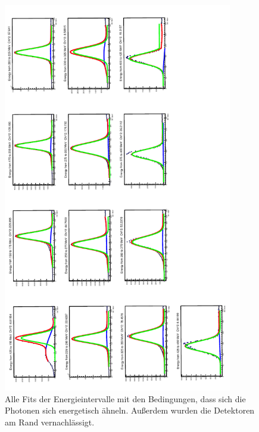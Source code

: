 \documentclass[a4paper,11pt,oneside,final,german,openbib,pdftex]{scrbook}
\begin{document}
{\begin{appendix}
\begin{figure}[h!]
	\begin{center}
		\includegraphics[width=100mm]{20170405Strahlzeit30DegreeCutAllFits}
		\caption[Strahlzeit: Ohne Detektoren am Rand; alle Fits]{Alle Fits der Energieintervalle mit den Bedingungen, dass sich die Photonen sich energetisch ähneln. Au{\ss}erdem wurden die Detektoren am Rand vernachl\"assigt.}
		\label{fig:30-Degree-Cut-RealData-All-Fits}
	\end{center}
\end{figure}







\end{appendix}}
\end{document}
